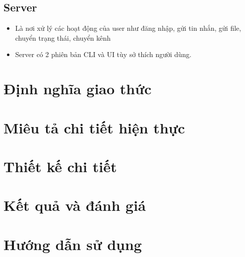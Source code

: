 \documentclass[a4paper]{article}
\begin{document}
	\subsection{Server}
	\begin{itemize}
		\item Là nơi xử lý các hoạt động của user như đăng nhập, gửi tin nhắn, gửi file, chuyển trạng thái, chuyển kênh
		\item Server có 2 phiên bản CLI và UI tùy sở thích người dùng.
	\end{itemize}

\section{Định nghĩa giao thức}

\section{Miêu tả chi tiết hiện thực}

\section{Thiết kế chi tiết}

\section{Kết quả và đánh giá}

\section{Hướng dẫn sử dụng}
\end{document}
